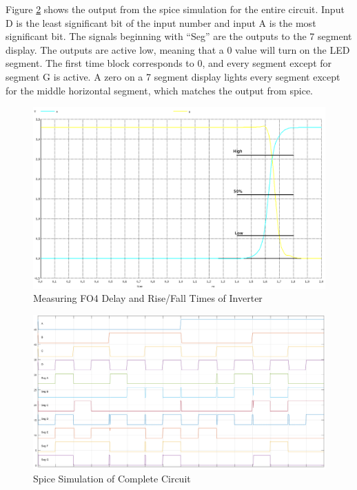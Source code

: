 \documentclass[12pt]{article}
\begin{document}
Figure \ref{fig:fullCktSpice} shows the output from the spice simulation for the entire circuit. 
Input D is the least significant bit of the input number and input A is the most significant bit.
The signals beginning with ``Seg'' are the outputs to the 7 segment display.
The outputs are active low, meaning that a 0 value will turn on the LED segment.
The first time block corresponds to 0, and every segment except for segment G is active. 
A zero on a 7 segment display lights every segment except for the middle horizontal segment, which matches the output from spice.

\begin{figure}[H]
	\centering
	\includegraphics[width=\textwidth, keepaspectratio]{Graphics/FO4_Delay}
	\caption{Measuring FO4 Delay and Rise/Fall Times of Inverter}
	\label{fig:delay_rise_fall}
\end{figure}

\begin{figure}[H]
	\centering
	\includegraphics[width=\textwidth, keepaspectratio]{Graphics/7seg.png}
	\caption{Spice Simulation of Complete Circuit}
	\label{fig:fullCktSpice}
\end{figure}
\end{document}
